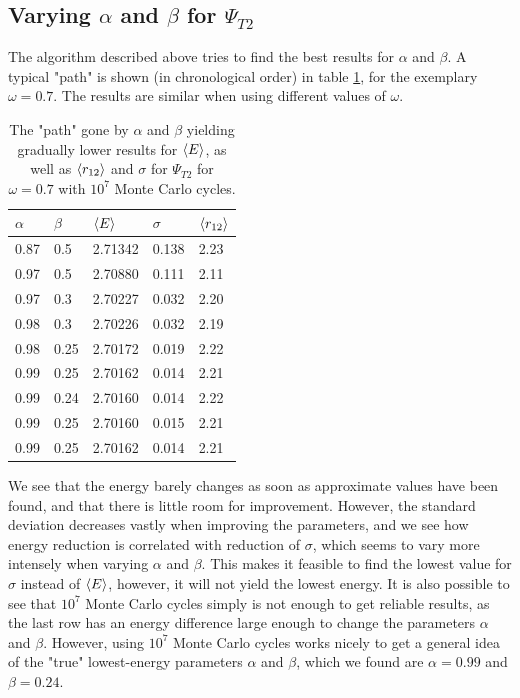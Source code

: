 \documentclass[10pt,a4paper]{article}
\begin{document}
\subsection{Varying $\alpha$ and $\beta$ for $\Psi_{T2}$}
The algorithm described above tries to find the best results for $\alpha$ and $\beta$. A typical "path" is shown (in chronological order) in table \ref{table2}, for the exemplary $\omega=0.7$. The results are similar when using different values of $\omega$.
\begin{table}[H]
\centering
\caption[Varying $\alpha$ and $\beta$]{The "path" gone by  $\alpha$ and $\beta$ yielding gradually lower results for  $\braket{E}$, as well as  $\braket{r_{12}}$ and $\sigma$ for $\Psi_{T2}$ for $\omega=0.7$ with $10^7$ Monte Carlo cycles.}
\begin{tabular}{|l|l|l|l|l|}
\hline
$\alpha$ & $\beta$ & $\braket{E}$ & $\sigma$ & $\braket{r_{12}}$ \\ \hline
0.87     & 0.5     & 2.71342        & 0.138    & 2.23              \\ \hline
0.97     & 0.5     & 2.70880       & 0.111    & 2.11              \\ \hline
0.97     & 0.3     & 2.70227        & 0.032    & 2.20              \\ \hline
0.98     & 0.3     & 2.70226        & 0.032    & 2.19              \\ \hline
0.98     & 0.25    & 2.70172        & 0.019    & 2.22              \\ \hline
0.99     & 0.25    & 2.70162        & 0.014    & 2.21              \\ \hline
0.99     & 0.24    & 2.70160        & 0.014    & 2.22              \\ \hline
0.99     & 0.25    & 2.70160        & 0.015    & 2.21              \\ \hline
0.99     & 0.25    & 2.70162        & 0.014    & 2.21              \\ \hline
\end{tabular}\label{table2}
\end{table}
We see that the energy barely changes as soon as approximate values have been found, and that there is little room for improvement. However, the standard deviation decreases vastly when improving the parameters, and we see how energy reduction is correlated with reduction of $\sigma$, which seems to vary more intensely when varying $\alpha$ and $\beta$. This makes it feasible to find the lowest value for $\sigma$ instead of $\braket{E}$, however, it will not yield the lowest energy. It is also possible to see that $10^7$ Monte Carlo cycles simply is not enough to get reliable results, as the last row has an energy difference large enough to change the parameters $\alpha$ and $\beta$. However, using $10^7$ Monte Carlo cycles works nicely to get a general idea of the "true" lowest-energy parameters $\alpha$ and $\beta$, which we found are $\alpha=0.99$ and $\beta=0.24$.
\end{document}
